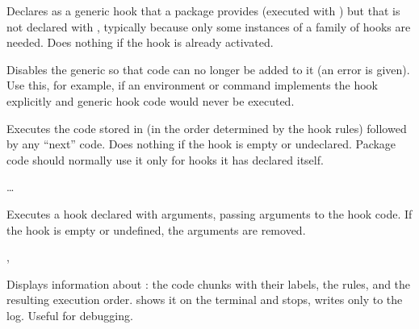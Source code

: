 \documentclass{l3in2edoc}
\begin{document}
\begin{function}[user]
  {
    \ActivateGenericHook
  }
  \begin{syntax}
     
  \end{syntax}
  Declares  as a generic hook that a package provides
  (executed with ) but that is not declared with
  , typically because only some instances of a family
  of hooks are needed. Does nothing if the hook is already activated.
\end{function}


\begin{function}[]
  {
    \DisableGenericHook
  }
  \begin{syntax}
     
  \end{syntax}
  Disables the generic  so that code can no longer be added
  to it (an error is given). Use this, for example, if an environment
  or command implements the hook explicitly and generic hook code
  would never be executed.
\end{function}




\begin{function}[]
  {
    \UseHook
  }
  \begin{syntax}
     
  \end{syntax}
  Executes the code stored in  (in the order determined by
  the hook rules) followed by any \enquote{next} code. Does nothing if
  the hook is empty or undeclared. Package code should normally use it
  only for hooks it has declared itself.
\end{function}



\begin{function}[]
  {
    \UseHookWithArguments
  }
  \begin{syntax}
        \ldots{} 
  \end{syntax}
  Executes a hook declared with arguments, passing 
  arguments to the hook code. If the hook is empty or undefined, the
  arguments are removed.
\end{function}





\begin{function}[]
  {
    \ShowHook,
    \LogHook
  }
  \begin{syntax}
     
  \end{syntax}
  Displays information about : the code chunks with their
  labels, the rules, and the resulting execution order. 
  shows it on the terminal and stops,  writes only to
  the log. Useful for debugging.
\end{function}
\end{document}
